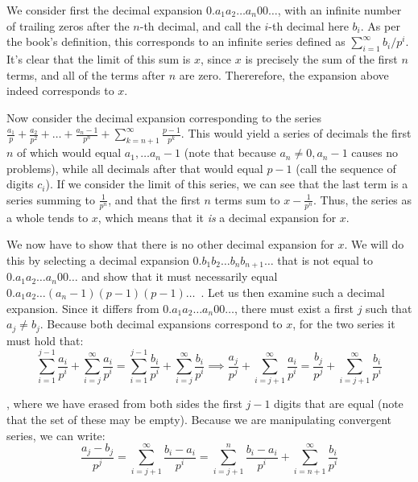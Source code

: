 \begin{solution}

    We consider first the decimal expansion $0.a_1 a_2 \ldots a_n 0 0 \ldots$, with an infinite number of trailing zeros after the $n$-th decimal, and call the $i$-th decimal here $b_i$. As per the book's definition, this corresponds to an infinite series defined as $\sum_{i=1}^{\infty}b_i/p^i$. It's clear that the limit of this sum is $x$, since $x$ is precisely the sum of the first $n$ terms, and all of the terms after $n$ are zero. Thererefore, the expansion above indeed corresponds to $x$.

    Now consider the decimal expansion corresponding to the series $\frac{a_1}{p} + \frac{a_2}{p^2}+ \ldots + \frac{a_n - 1}{p^n} + \sum_{k=n+1}^{\infty}\frac{p-1}{p^k}$. This would yield a series of decimals the first $n$ of which would equal $a_1, \ldots a_n - 1$ (note that because $a_n \neq 0, a_n -1$ causes no problems), while all decimals after that would equal $p-1$ (call the sequence of digits $c_i$). If we consider the limit of this series, we can see that the last term is a series summing to $\frac{1}{p^n}$, and that the first $n$ terms sum to $x - \frac{1}{p^n}$. Thus, the series as a whole tends to $x$, which means that it \textit{is} a decimal expansion for $x$.

    We now have to show that there is no other decimal expansion for $x$. We will do this by selecting a decimal expansion $0.b_1 b_2 \ldots b_n b_{n+1} \ldots$ that is not equal to $0.a_1a_2 \ldots a_n 00\ldots$ and show that it must necessarily equal $0.a_1 a_2 \ldots (a_n-1) (p-1) (p-1)\ldots$\ . Let us then examine such a decimal expansion. Since it differs from $0.a_1 a_2 \ldots a_n 00\ldots$, there must exist a first $j$ such that $a_j \neq b_j$. Because both decimal expansions correspond to $x$, for the two series it must hold that:
    $$\sum_{i=1}^{j-1}\frac{a_i}{p^i} + \sum_{i=j}^{\infty}\frac{a_i}{p^i} = \sum_{i=1}^{j-1}\frac{b_i}{p^i} + \sum_{i=j}^{\infty}\frac{b_i}{p^i} \implies \frac{a_j}{p^j} + \sum_{i=j+1}^{\infty} \frac{a_i}{p^i} = \frac{b_j}{p^j} + \sum_{i=j+1}^{\infty}\frac{b_i}{p^i}$$

    , where we have erased from both sides the first $j-1$ digits that are equal (note that the set of these may be empty). Because we are manipulating convergent series, we can write:
    $$\frac{a_j - b_j}{p^j} = \sum_{i=j+1}^{\infty}\frac{b_i - a_i}{p^i} = \sum_{i=j+1}^{n} \frac{b_i-a_i}{p^i} + \sum_{i=n+1}^{\infty}\frac{b_i}{p^i}$$


\end{solution}
